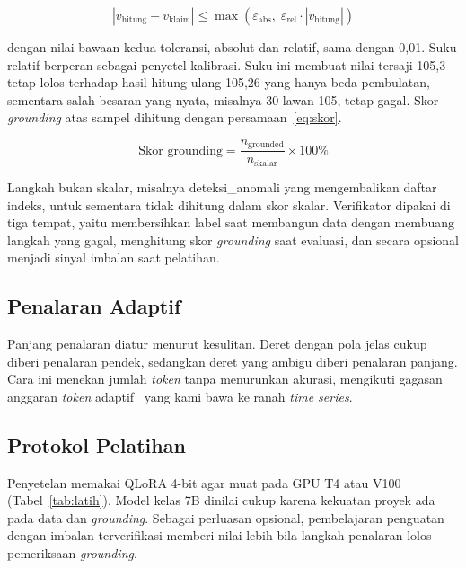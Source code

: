 \documentclass[10pt,a4paper,twocolumn]{article}
\begin{document}
\begin{equation}
\label{eq:grounded}
\left| v_{\text{hitung}} - v_{\text{klaim}} \right|
\le \max\!\left( \varepsilon_{\text{abs}},\;
\varepsilon_{\text{rel}} \cdot \left| v_{\text{hitung}} \right| \right)
\end{equation}

dengan nilai bawaan kedua toleransi, absolut dan relatif, sama dengan 0,01. Suku
relatif berperan sebagai penyetel kalibrasi. Suku ini membuat nilai tersaji
105,3 tetap lolos terhadap hasil hitung ulang 105,26 yang hanya beda pembulatan,
sementara salah besaran yang nyata, misalnya 30 lawan 105, tetap gagal. Skor
\textit{grounding} atas sampel dihitung dengan persamaan~\eqref{eq:skor}.

\begin{equation}
\label{eq:skor}
\text{Skor grounding} = \frac{n_{\text{grounded}}}{n_{\text{skalar}}} \times 100\%
\end{equation}

Langkah bukan skalar, misalnya deteksi\_anomali yang mengembalikan daftar indeks,
untuk sementara tidak dihitung dalam skor skalar. Verifikator dipakai di tiga
tempat, yaitu membersihkan label saat membangun data dengan membuang langkah
yang gagal, menghitung skor \textit{grounding} saat evaluasi, dan secara
opsional menjadi sinyal imbalan saat pelatihan.

\subsection{Penalaran Adaptif}
Panjang penalaran diatur menurut kesulitan. Deret dengan pola jelas cukup diberi
penalaran pendek, sedangkan deret yang ambigu diberi penalaran panjang. Cara ini
menekan jumlah \textit{token} tanpa menurunkan akurasi, mengikuti gagasan
anggaran \textit{token} adaptif~\cite{selfbudgeter2025} yang kami bawa ke ranah
\textit{time series}.

\subsection{Protokol Pelatihan}
Penyetelan memakai QLoRA 4-bit agar muat pada GPU T4 atau V100
(Tabel~\ref{tab:latih}). Model kelas 7B dinilai cukup karena kekuatan proyek ada
pada data dan \textit{grounding}. Sebagai perluasan opsional, pembelajaran
penguatan dengan imbalan terverifikasi memberi nilai lebih bila langkah
penalaran lolos pemeriksaan \textit{grounding}.
\end{document}
